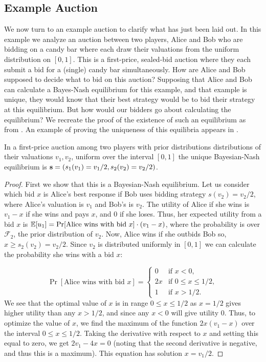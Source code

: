 \documentclass[12pt,twoside]{reedthesis}
\begin{document}
\subsection{Example Auction}
We now turn to an example auction to clarify what has just been laid out. In this example we analyze an auction between two players, Alice and Bob who are bidding on a candy bar where each draw their valuations from the uniform distribution on $[0,1]$. This is a first-price, sealed-bid auction where they each submit a bid for a (single) candy bar simultaneously. How are Alice and Bob supposed to decide what to bid on this auction? Supposing that Alice and Bob can calculate a Bayes-Nash equilibrium for this example, and that example is unique, they would know that their best strategy would be to bid their strategy at this equilibrium. But how would our bidders go about calculating the equilibrium? We recreate the proof of the existence of such an equilibrium as from \cite{Nisan2007}. An example of proving the uniqueness of this equilibria appears in \cite{Levin2002}.

\begin{prop}
	In a first-price auction among two players with prior distributions distributions of their valuations $v_1,v_2$, uniform over the interval $[0,1]$ the unique Bayesian-Nash equilibrium is $\textbf{s} = (s_1(v_1) = v_1 / 2, s_2(v_2) = v_2 / 2)$.
\end{prop}

\begin{proof}{\citep{Nisan2007}}
	First we show that this is a Bayesian-Nash equilibrium. Let us consider which bid $x$ is Alice's best response if Bob uses bidding strategy $s(v_2) = v_2/2$, where Alice's valuation is $v_1$ and Bob's is $v_2$. The utility of Alice if she wins is $v_1 - x$ if she wins and pays $x$, and $0$ if she loses. Thus, her expected utility from a bid $x$ is $\mathbb{E}[u_1] = \Pr[\text{Alice wins with bid } x] \cdot (v_1 -x)$, where the probability is over $\mathcal{F}_2$, the prior distribution of $v_2$. Now, Alice wins if she outbids Bob so, $x \geq s_2(v_2) = v_2 / 2$. Since $v_2$ is distributed uniformly in $[0,1]$ we can calculate the probability she wins with a bid $x$: 
	
	\[
	\Pr[\text{Alice wins with bid } x] =
	\begin{cases}
	0 & \text{if } x < 0, \\
	2x & \text{if } 0 \leq x \leq 1/2,\\
	1 & \text{if } x > 1/2.
	\end{cases}
	\]
We see that the optimal value of $x$ is in range $0 \leq x \leq 1/2$ as $x = 1/2$ gives higher utility than any $x > 1/2$, and since any $x < 0$ will give utility $0$. Thus, to optimize the value of $x$, we find the maximum of the function $2x(v_1 - x)$ over the interval $0 \leq x \leq 1/2$. Taking the derivative with respect to $x$ and setting this equal to zero, we get $2v_1 - 4x = 0$ (noting that the second derivative is negative, and thus this is a maximum). This equation has solution $x = v_1/2$.
\end{proof}
\end{document}
